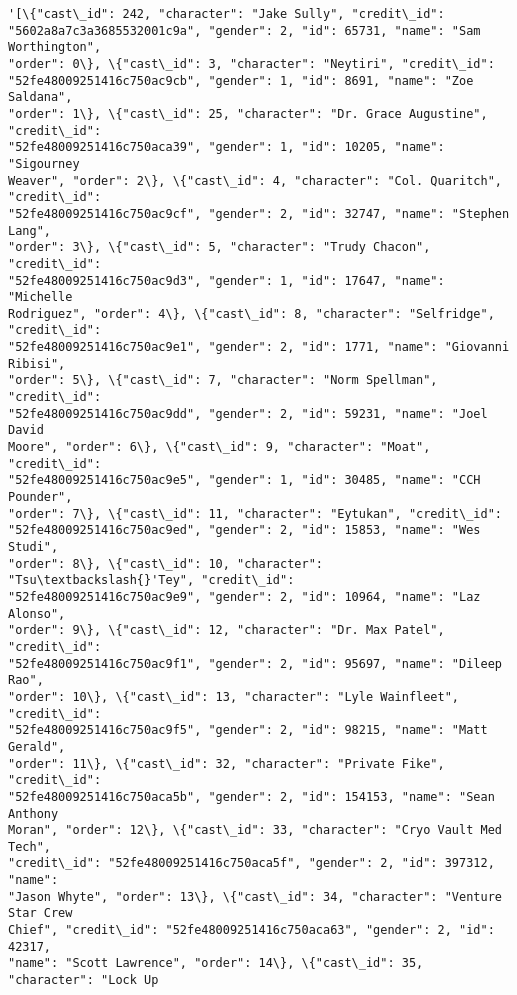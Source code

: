 \documentclass[11pt]{article}
\makeatletter
\newcommand{\boxspacing}{\kern\kvtcb@left@rule\kern\kvtcb@boxsep}
\newcommand{\prompt}[4]{
        {\ttfamily\llap{{\color{#2}[#3]:\hspace{3pt}#4}}\vspace{-\baselineskip}}
    }
\makeatother
\begin{document}
            \begin{tcolorbox}[breakable, size=fbox, boxrule=.5pt, pad at break*=1mm, opacityfill=0]
\prompt{Out}{outcolor}{20}{\boxspacing}
\begin{Verbatim}[commandchars=\\\{\}]
'[\{"cast\_id": 242, "character": "Jake Sully", "credit\_id":
"5602a8a7c3a3685532001c9a", "gender": 2, "id": 65731, "name": "Sam Worthington",
"order": 0\}, \{"cast\_id": 3, "character": "Neytiri", "credit\_id":
"52fe48009251416c750ac9cb", "gender": 1, "id": 8691, "name": "Zoe Saldana",
"order": 1\}, \{"cast\_id": 25, "character": "Dr. Grace Augustine", "credit\_id":
"52fe48009251416c750aca39", "gender": 1, "id": 10205, "name": "Sigourney
Weaver", "order": 2\}, \{"cast\_id": 4, "character": "Col. Quaritch", "credit\_id":
"52fe48009251416c750ac9cf", "gender": 2, "id": 32747, "name": "Stephen Lang",
"order": 3\}, \{"cast\_id": 5, "character": "Trudy Chacon", "credit\_id":
"52fe48009251416c750ac9d3", "gender": 1, "id": 17647, "name": "Michelle
Rodriguez", "order": 4\}, \{"cast\_id": 8, "character": "Selfridge", "credit\_id":
"52fe48009251416c750ac9e1", "gender": 2, "id": 1771, "name": "Giovanni Ribisi",
"order": 5\}, \{"cast\_id": 7, "character": "Norm Spellman", "credit\_id":
"52fe48009251416c750ac9dd", "gender": 2, "id": 59231, "name": "Joel David
Moore", "order": 6\}, \{"cast\_id": 9, "character": "Moat", "credit\_id":
"52fe48009251416c750ac9e5", "gender": 1, "id": 30485, "name": "CCH Pounder",
"order": 7\}, \{"cast\_id": 11, "character": "Eytukan", "credit\_id":
"52fe48009251416c750ac9ed", "gender": 2, "id": 15853, "name": "Wes Studi",
"order": 8\}, \{"cast\_id": 10, "character": "Tsu\textbackslash{}'Tey", "credit\_id":
"52fe48009251416c750ac9e9", "gender": 2, "id": 10964, "name": "Laz Alonso",
"order": 9\}, \{"cast\_id": 12, "character": "Dr. Max Patel", "credit\_id":
"52fe48009251416c750ac9f1", "gender": 2, "id": 95697, "name": "Dileep Rao",
"order": 10\}, \{"cast\_id": 13, "character": "Lyle Wainfleet", "credit\_id":
"52fe48009251416c750ac9f5", "gender": 2, "id": 98215, "name": "Matt Gerald",
"order": 11\}, \{"cast\_id": 32, "character": "Private Fike", "credit\_id":
"52fe48009251416c750aca5b", "gender": 2, "id": 154153, "name": "Sean Anthony
Moran", "order": 12\}, \{"cast\_id": 33, "character": "Cryo Vault Med Tech",
"credit\_id": "52fe48009251416c750aca5f", "gender": 2, "id": 397312, "name":
"Jason Whyte", "order": 13\}, \{"cast\_id": 34, "character": "Venture Star Crew
Chief", "credit\_id": "52fe48009251416c750aca63", "gender": 2, "id": 42317,
"name": "Scott Lawrence", "order": 14\}, \{"cast\_id": 35, "character": "Lock Up

\end{Verbatim}
\end{tcolorbox}
\end{document}
